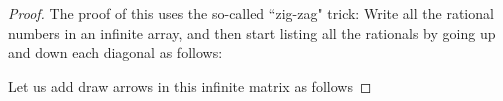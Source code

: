 \documentclass[11pt,dvipsnames]{book}
\numberwithin{figure}{section} %
\numberwithin{table}{section} %
\begin{document}
\begin{proof}
The proof of this uses the so-called ``zig-zag" trick: Write all the rational numbers in an infinite array, and then start listing all the rationals by going up and down each diagonal as follows:

 Let us add draw arrows in this infinite matrix as
follows



\end{proof}
\end{document}
